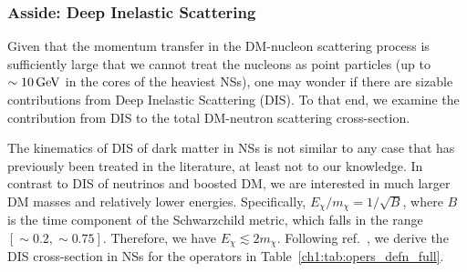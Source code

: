 \subsubsection{Asside: Deep Inelastic Scattering}
\label{ch5:subsubsec:DIS}
Given that the momentum transfer in the DM-nucleon scattering process is sufficiently large that we cannot treat the nucleons as point particles (up to $\sim 10{\rm \,GeV}$ in the cores of the heaviest NSs), one may wonder if there are sizable contributions from Deep Inelastic Scattering (DIS). To that end, we examine the contribution from DIS to the total DM-neutron scattering cross-section. 

The kinematics of DIS of dark matter in NSs is not similar to any case that has previously been treated in the literature, at least not to our knowledge. In contrast to DIS of neutrinos and boosted DM, we are interested in much larger DM masses and relatively lower energies.  Specifically, $E_\chi/m_\chi=1/\sqrt{B}$, where $B$ is the time component of the Schwarzchild metric, which falls in the range $[\sim0.2,\sim0.75]$.  Therefore, we have  $E_\chi\lesssim 2m_\chi$. Following ref.~\cite{Agashe:2014yua_Directdetectionboosted}, we derive the DIS cross-section in NSs for the operators in Table~\ref{ch1:tab:opers_defn_full}. 

